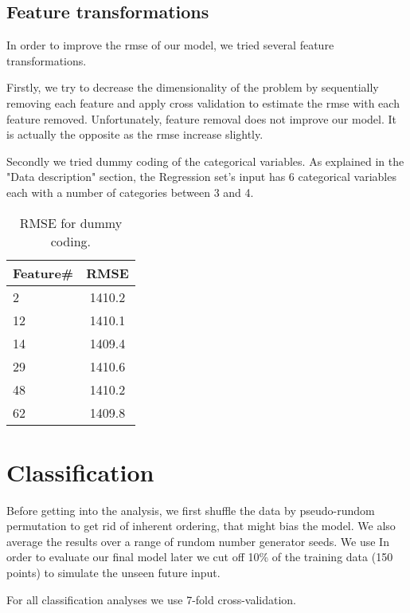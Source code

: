 \documentclass{article} %
\begin{document}
\subsection{Feature transformations}
In order to improve the rmse of our model, we tried several feature transformations.

Firstly, we try to decrease the dimensionality of the problem by sequentially removing each feature and apply cross validation to estimate the rmse with each feature removed.
Unfortunately, feature removal does not improve our model. It is actually the opposite as the rmse increase slightly.

Secondly we tried dummy coding of the categorical variables.
As explained in the "Data description" section, the Regression set's input has 6 categorical variables each with a number of categories between 3 and 4.

\begin{table}[h]
	\begin{center}
		\begin{tabular}{l|c}
			Feature\# & RMSE  \\
			\hline
			2 &  1410.2 \\
			12 & 1410.1 \\
			14 &  1409.4 \\
			29 &  1410.6 \\
			48 &  1410.2 \\
			62 &  1409.8 \\
		\end{tabular}
		\caption{RMSE for dummy coding.}
		\label{tab:regression-dummy}
	\end{center}
\end{table}

\section{Classification}

Before getting into the analysis, we first shuffle the data by pseudo-rundom permutation to get rid of inherent ordering, that might bias the model. We also average the results over a range of rundom number generator seeds. We use In order to evaluate our final model later we cut off 10\% of the training data (150 points) to simulate the unseen future input.

For all classification analyses we use 7-fold cross-validation. 
\end{document}
